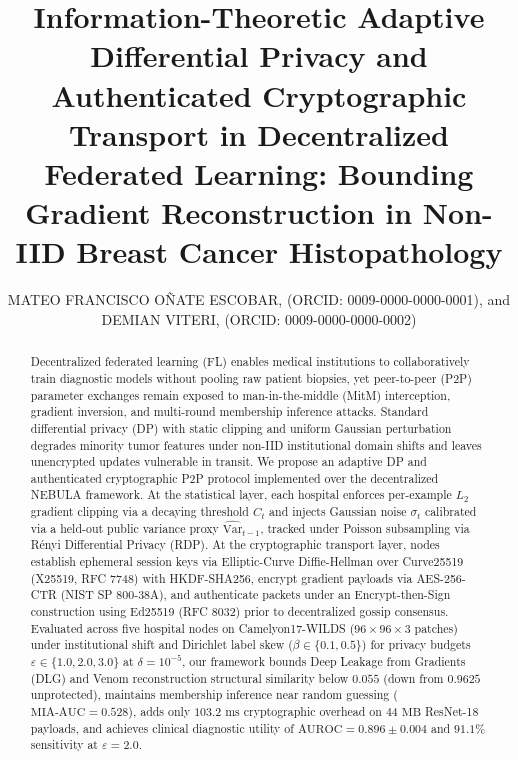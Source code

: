 \documentclass{ieeeaccess}
\begin{document}

\title{Information-Theoretic Adaptive Differential Privacy and Authenticated Cryptographic Transport in Decentralized Federated Learning: Bounding Gradient Reconstruction in Non-IID Breast Cancer Histopathology}

\author{\uppercase{Mateo Francisco O\~nate Escobar}, (ORCID: 0009-0000-0000-0001), and \uppercase{Demian Viteri}, (ORCID: 0009-0000-0000-0002)}
\address[1]{School of Mathematical and Computational Sciences, Yachay Tech University, Urcuqu\'i 100119, Ecuador (e-mail: mateo.onate@yachaytech.edu.ec)}
\address[2]{School of Mathematical and Computational Sciences, Yachay Tech University, Urcuqu\'i 100119, Ecuador (e-mail: demian.viteri@yachaytech.edu.ec)}


\begin{abstract}
Decentralized federated learning (FL) enables medical institutions to collaboratively train diagnostic models without pooling raw patient biopsies, yet peer-to-peer (P2P) parameter exchanges remain exposed to man-in-the-middle (MitM) interception, gradient inversion, and multi-round membership inference attacks. Standard differential privacy (DP) with static clipping and uniform Gaussian perturbation degrades minority tumor features under non-IID institutional domain shifts and leaves unencrypted updates vulnerable in transit. We propose an adaptive DP and authenticated cryptographic P2P protocol implemented over the decentralized NEBULA framework. At the statistical layer, each hospital enforces per-example $L_2$ gradient clipping via a decaying threshold $C_t$ and injects Gaussian noise $\sigma_t$ calibrated via a held-out public variance proxy $\widehat{\text{Var}}_{t-1}$, tracked under Poisson subsampling via R\'enyi Differential Privacy (RDP). At the cryptographic transport layer, nodes establish ephemeral session keys via Elliptic-Curve Diffie-Hellman over Curve25519 (X25519, RFC 7748) with HKDF-SHA256, encrypt gradient payloads via AES-256-CTR (NIST SP 800-38A), and authenticate packets under an Encrypt-then-Sign construction using Ed25519 (RFC 8032) prior to decentralized gossip consensus. Evaluated across five hospital nodes on Camelyon17-WILDS ($96 \times 96 \times 3$ patches) under institutional shift and Dirichlet label skew ($\beta \in \{0.1, 0.5\}$) for privacy budgets $\varepsilon \in \{1.0, 2.0, 3.0\}$ at $\delta = 10^{-5}$, our framework bounds Deep Leakage from Gradients (DLG) and Venom reconstruction structural similarity below $0.055$ (down from $0.9625$ unprotected), maintains membership inference near random guessing ($\text{MIA-AUC} = 0.528$), adds only $103.2\text{ ms}$ cryptographic overhead on $44\text{ MB}$ ResNet-18 payloads, and achieves clinical diagnostic utility of $\text{AUROC} = 0.896 \pm 0.004$ and $91.1\%$ sensitivity at $\varepsilon = 2.0$.
\end{abstract}
\end{document}
